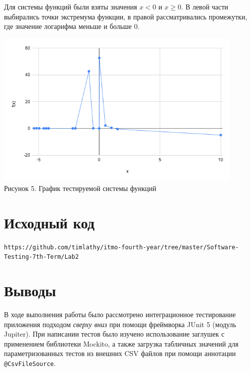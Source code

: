 \documentclass[listings]{labreport}
\begin{document}
Для системы функций были взяты значения $x < 0$ и $x \geqslant 0$. В левой части
выбирались точки экстремума функции, в правой рассматривались промежутки, где значение
логарифма меньше и больше $0$.

\begin{center}
\includegraphics[width=0.9\textwidth]{Lab2_fn_plot.png}\\
Рисунок 5. График тестируемой системы функций
\end{center}

\section*{Исходный код}

\verb|https://github.com/timlathy/itmo-fourth-year/tree/master/Software-Testing-7th-Term/Lab2|

\section*{Выводы}

В ходе выполнения работы было рассмотрено интеграционное тестирование приложения подходом
\textit{сверху вниз} при помощи фреймворка JUnit 5 (модуль Jupiter). При написании
тестов было изучено использование заглушек с применением библиотеки Mockito, а также
загрузка табличных значений для параметризованных тестов из внешних CSV файлов
при помощи аннотации \verb|@CsvFileSource|.
\end{document}

